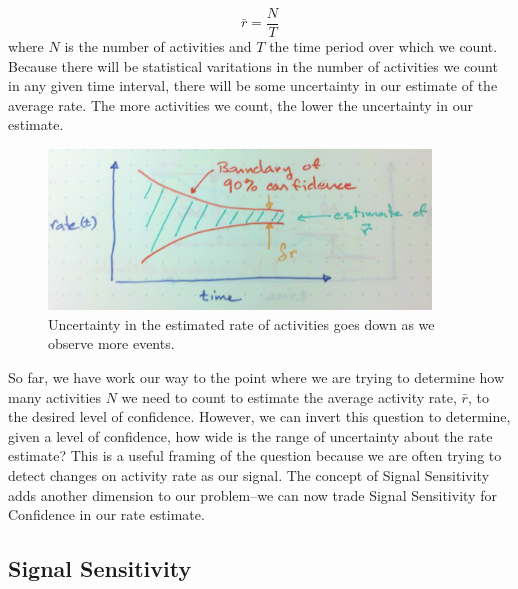 \documentclass{article}
\begin{document}
\begin{equation}
    \label{eq:rateEst}
    \bar{r} = \frac{N}{T}
\end{equation}
where $N$ is the number of activities and $T$ the time period over which we count.  Because there will be statistical varitations in the number of activities we count in any given time interval, there will be some uncertainty in our estimate of the average rate. The more activities we count, the lower the uncertainty in our estimate.

%
\begin{figure}[h]
	\begin{center}
		\includegraphics[width=4.0in]{./imgs/confidence.jpg}
	\end{center}
	\caption{Uncertainty in the estimated rate of activities goes down as we observe more events. }
    	\label{fig:confidence}
\end{figure}
%
%


%
%
%

So far, we have work our way to the point where we are trying to determine how many activities $N$ we need to count to estimate the average activity rate, $\bar{r}$, to the desired level of confidence. However, we can invert this question to determine, given a level of confidence, how wide is the range of uncertainty about the rate estimate?  This is a useful framing of the question because we are often trying to detect changes on activity rate as our signal. The concept of Signal Sensitivity adds another dimension to our problem--we can now trade Signal Sensitivity for Confidence in our rate estimate.

\subsection{Signal Sensitivity}
\end{document}
